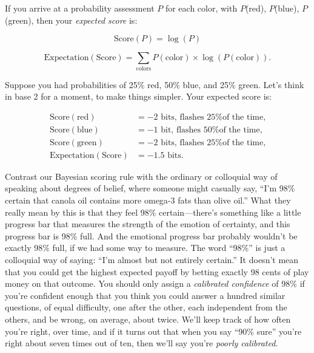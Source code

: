{
 If you arrive at a probability assessment $P$ for each color, with
$P$(red), $P$(blue), $P$(green), then your \textit{expected score} is:}

\begin{equation*}
 \text{Score}(P) = \log(P)
\end{equation*}


\begin{equation*}
  \text{Expectation}(\text{Score}) = \sum_{\text{colors}}P(\text{color})\times\log(P(\text{color})).
\end{equation*}


\bigskip

{
 Suppose you had probabilities of 25\% red, 50\% blue, and 25\%
green. Let's think in base 2 for a moment, to make
things simpler. Your expected score is:}

\begin{align*}
 \text{Score}(\text{red}) &= -2 \text{ bits, flashes 25\% of the time,}\\
 \text{Score}(\text{blue}) &= -1 \text{ bit, flashes 50\% of the time,}\\
 \text{Score}(\text{green}) &= -2 \text{ bits, flashes 25\% of the time,} \\
 \text{Expectation}(\text{Score}) &= -1.5 \text{ bits.}
\end{align*}

{
 Contrast our Bayesian scoring rule with the ordinary or colloquial
way of speaking about degrees of belief, where someone might casually
say, ``I'm 98\% certain that canola
oil contains more omega-3 fats than olive oil.'' What
they really mean by this is that they feel 98\%
certain---there's something like a little progress bar
that measures the strength of the emotion of certainty, and this
progress bar is 98\% full. And the emotional progress bar probably
wouldn't be exactly 98\% full, if we had some way to
measure. The word ``98\%'' is just a
colloquial way of saying: ``I'm almost
but not entirely certain.'' It
doesn't mean that you could get the highest expected
payoff by betting exactly 98 cents of play money on that outcome. You
should only assign a \textit{calibrated confidence} of 98\% if
you're confident enough that you think you could answer
a hundred similar questions, of equal difficulty, one after the other,
each independent from the others, and be wrong, on average, about
twice. We'll keep track of how often
you're right, over time, and if it turns out that when
you say ``90\% sure''
you're right about seven times out of ten, then
we'll say you're \textit{poorly
calibrated}.}

